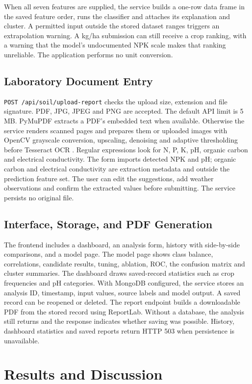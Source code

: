 \documentclass[conference]{IEEEtran}
\begin{document}
When all seven features are supplied, the service builds a one-row data frame in the saved feature order, runs the classifier and attaches its explanation and cluster. A permitted input outside the stored dataset ranges triggers an extrapolation warning. A kg/ha submission can still receive a crop ranking, with a warning that the model's undocumented NPK scale makes that ranking unreliable. The application performs no unit conversion.

\subsection{Laboratory Document Entry}
\texttt{POST /api/soil/upload-report} checks the upload size, extension and file signature. PDF, JPG, JPEG and PNG are accepted. The default API limit is 5 MB. PyMuPDF extracts a PDF's embedded text when available. Otherwise the service renders scanned pages and prepares them or uploaded images with OpenCV grayscale conversion, upscaling, denoising and adaptive thresholding before Tesseract OCR \cite{tesseract}. Regular expressions look for N, P, K, pH, organic carbon and electrical conductivity. The form imports detected NPK and pH; organic carbon and electrical conductivity are extraction metadata and outside the prediction feature set. The user can edit the suggestions, add weather observations and confirm the extracted values before submitting. The service persists no original file.

\subsection{Interface, Storage, and PDF Generation}
The frontend includes a dashboard, an analysis form, history with side-by-side comparisons, and a model page. The model page shows class balance, correlations, candidate results, tuning, ablation, ROC, the confusion matrix and cluster summaries. The dashboard draws saved-record statistics such as crop frequencies and pH categories. With MongoDB configured, the service stores an analysis ID, timestamp, input values, source labels and model output. A saved record can be reopened or deleted. The report endpoint builds a downloadable PDF from the stored record using ReportLab. Without a database, the analysis still returns and the response indicates whether saving was possible. History, dashboard statistics and saved reports return HTTP 503 when persistence is unavailable.

\section{Results and Discussion}
\end{document}
